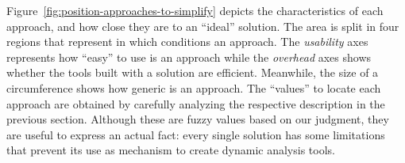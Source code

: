 Figure~\ref{fig:position-approaches-to-simplify} depicts the characteristics of each approach, and how close they are to an ``ideal'' solution.
The area is split in four regions that represent in which conditions an approach.
The \textit{usability} axes represents how ``easy'' to use is an approach while the \textit{overhead} axes shows whether the tools built with a solution are efficient. 
Meanwhile, the size of a circumference shows how generic is an approach.
The ``values'' to locate each approach are obtained by carefully analyzing the respective description in the previous section.
Although these are fuzzy values based on our judgment, they are useful to express an actual fact: every single solution has some limitations that prevent its use as mechanism to create dynamic analysis tools. 

\newcommand{\asymcloud}[2][.1]{%
\begin{scope}[#2]
\pgftransformscale{#1}%
\pgfpathmoveto{\pgfpoint{261 pt}{115 pt}} 
  \pgfpathcurveto{\pgfqpoint{70 pt}{107 pt}}
                 {\pgfqpoint{137 pt}{291 pt}}
                 {\pgfqpoint{260 pt}{273 pt}} 
  \pgfpathcurveto{\pgfqpoint{78 pt}{382 pt}}
                 {\pgfqpoint{381 pt}{445 pt}}
                 {\pgfqpoint{412 pt}{410 pt}}
  \pgfpathcurveto{\pgfqpoint{577 pt}{587 pt}}
                 {\pgfqpoint{698 pt}{488 pt}}
                 {\pgfqpoint{685 pt}{366 pt}}
  \pgfpathcurveto{\pgfqpoint{840 pt}{192 pt}}
                 {\pgfqpoint{610 pt}{157 pt}}
                 {\pgfqpoint{610 pt}{157 pt}}
  \pgfpathcurveto{\pgfqpoint{531 pt}{39 pt}}
                 {\pgfqpoint{298 pt}{51 pt}}
                 {\pgfqpoint{261 pt}{115 pt}}
\pgfusepath{fill,stroke}         
\end{scope}}  

